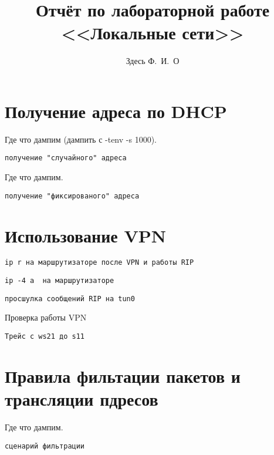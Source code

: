 \documentclass[a4paper,12pt]{article}
\title{Отчёт по лабораторной работе \\ <<Локальные сети>>}
\author{Здесь Ф.~И.~О}
\begin{document}
\maketitle

\tableofcontents


\section{Получение адреса по DHCP}

Где что дампим (дампить с -tenv -s 1000).

\begin{Verbatim}
получение "случайного" адреса
\end{Verbatim}

Где что дампим.

\begin{Verbatim}
получение "фиксированого" адреса
\end{Verbatim}


\section{Использование VPN}

\begin{Verbatim}
ip r на маршрутизаторе после VPN и работы RIP
\end{Verbatim}

\begin{Verbatim}
ip -4 a  на маршрутизаторе
\end{Verbatim}

\begin{Verbatim}
просшулка сообщений RIP на tun0
\end{Verbatim}

Проверка работы VPN

\begin{Verbatim}
Трейс с ws21 до s11
\end{Verbatim}

\section{Правила фильтации пакетов и трансляции пдресов}

Где что дампим. 

\begin{Verbatim}
сценарий фильтрации
\end{Verbatim}
\end{document}
